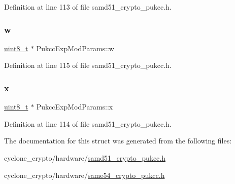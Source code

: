 Definition at line 113 of file samd51\+\_\+crypto\+\_\+pukcc.\+h.

\mbox{\label{structPukccExpModParams_a7f91b881310c040369e0c7a063160d30}} 
\subsubsection{\texorpdfstring{w}{w}}
{\footnotesize\ttfamily \hyperlink{stdint_8h_aba7bc1797add20fe3efdf37ced1182c5}{uint8\+\_\+t} $\ast$ Pukcc\+Exp\+Mod\+Params\+::w}



Definition at line 115 of file samd51\+\_\+crypto\+\_\+pukcc.\+h.

\mbox{\label{structPukccExpModParams_a50fa133f87c6d181134a98337b13202b}} 
\subsubsection{\texorpdfstring{x}{x}}
{\footnotesize\ttfamily \hyperlink{stdint_8h_aba7bc1797add20fe3efdf37ced1182c5}{uint8\+\_\+t} $\ast$ Pukcc\+Exp\+Mod\+Params\+::x}



Definition at line 114 of file samd51\+\_\+crypto\+\_\+pukcc.\+h.



The documentation for this struct was generated from the following files\+:\begin{DoxyCompactItemize}
\item 
cyclone\+\_\+crypto/hardware/\hyperlink{samd51__crypto__pukcc_8h}{samd51\+\_\+crypto\+\_\+pukcc.\+h}\item 
cyclone\+\_\+crypto/hardware/\hyperlink{same54__crypto__pukcc_8h}{same54\+\_\+crypto\+\_\+pukcc.\+h}\end{DoxyCompactItemize}
